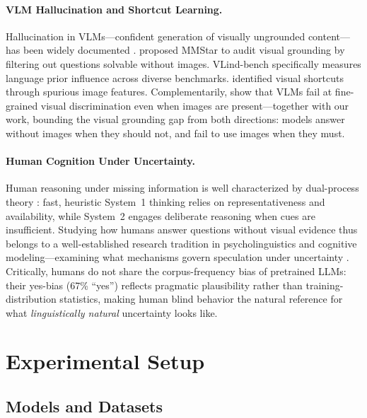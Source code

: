 \documentclass[letterpaper]{article}
\begin{document}
\paragraph{VLM Hallucination and Shortcut Learning.}
Hallucination in VLMs---confident generation of visually ungrounded
content---has been widely documented \citep{ji2023survey,rohrbach2018object,
xiao2021hallucination}. \citet{chen2024are} proposed MMStar to audit visual grounding by filtering
out questions solvable without images. VLind-bench
\citep{lee2024vlind} specifically measures language prior influence across
diverse benchmarks. \citet{han2024instinctive} identified visual shortcuts
through spurious image features. Complementarily, \citet{kim2025subtlebench}
show that VLMs fail at fine-grained visual discrimination even when images are
present---together with our work, bounding the visual grounding gap from both
directions: models answer without images when they should not, and fail to
use images when they must.

\paragraph{Human Cognition Under Uncertainty.}
Human reasoning under missing information is well characterized by dual-process
theory \citep{tversky1974judgment,kahneman2011thinking}: fast, heuristic
System~1 thinking relies on representativeness and availability, while System~2
engages deliberate reasoning when cues are insufficient. Studying how humans
answer questions without visual evidence thus belongs to a well-established
research tradition in psycholinguistics and cognitive modeling---examining what
mechanisms govern speculation under uncertainty \citep{bar2007proactive}.
Critically, humans do not share the corpus-frequency bias of pretrained LLMs:
their yes-bias (67\% ``yes'') reflects pragmatic plausibility rather than
training-distribution statistics, making human blind behavior the natural
reference for what \emph{linguistically natural} uncertainty looks like.

\section{Experimental Setup}

\subsection{Models and Datasets}
\label{sec:setup}
\end{document}
